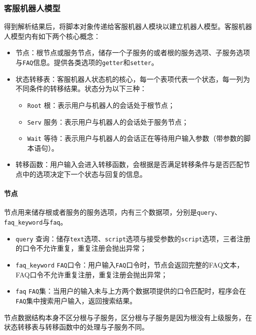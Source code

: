 \documentclass[hyperref]{ctexart}
\begin{document}
\subsubsection{客服机器人模型}
得到解析结果后，将脚本对象传递给客服机器人模块以建立机器人模型。客服机器人模型内有如下两个核心概念：
\begin{itemize}
    \item 节点：根节点或服务节点，储存一个子服务的或者根的服务选项、子服务选项与\texttt{FAQ}信息。提供各类选项的\texttt{getter}和\texttt{setter}。
    \item 状态转移表：客服机器人状态机的核心，每一个表项代表一个状态，每一列为不同条件的转移结果。状态分为以下三种：
    \begin{itemize}
        \item \texttt{Root} 根：表示用户与机器人的会话处于根节点；
        \item \texttt{Serv} 服务：表示用户与机器人的会话处于服务节点；
        \item \texttt{Wait} 等待：表示用户与机器人的会话正在等待用户输入参数（带参数的脚本语句）。
    \end{itemize}
    \item 转移函数：用户输入会进入转移函数，会根据是否满足转移条件与是否匹配节点中的选项决定下一个状态与回复的信息。
\end{itemize}
\paragraph{节点}
节点用来储存根或者服务的服务选项，内有三个数据项，分别是\texttt{query}、\texttt{faq\_keyword}与\texttt{faq}。
\begin{itemize}
    \item \texttt{query} 查询：储存\texttt{text}选项、\texttt{script}选项与接受参数的\texttt{script}选项，三者注册的口令不允许重复，重复注册会抛出异常；
    \item \texttt{faq\_keyword} \texttt{FAQ}口令：用户输入\texttt{FAQ}口令时，节点会返回完整的FAQ文本，FAQ口令不允许重复注册，重复注册会抛出异常；
    \item \texttt{faq} \texttt{FAQ}集：当用户的输入未与上方两个数据项提供的口令匹配时，程序会在\texttt{FAQ}集中搜索用户输入，返回搜索结果。
\end{itemize}
节点数据结构本身不区分根与子服务，区分根与子服务是因为根没有上级服务，在状态转移表与转移函数中的处理与子服务不同。
\end{document}
